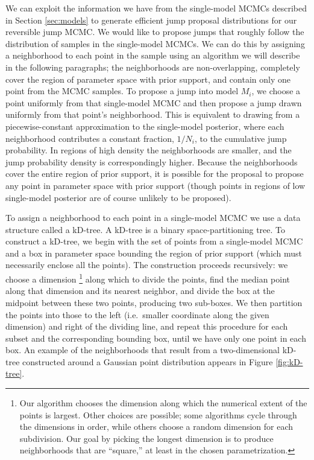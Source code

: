 \documentclass[preprint]{aastex}
\begin{document}
We can exploit the information we have from the single-model MCMCs
described in Section \ref{sec:models} to generate efficient jump
proposal distributions for our reversible jump MCMC.  We would like to
propose jumps that roughly follow the distribution of samples in the
single-model MCMCs.  We can do this by assigning a neighborhood to
each point in the sample using an algorithm we will describe in the
following paragraphs; the neighborhoods are non-overlapping,
completely cover the region of parameter space with prior support, and
contain only one point from the MCMC samples.  To propose a jump into
model $M_i$, we choose a point uniformly from that single-model MCMC
and then propose a jump drawn uniformly from that point's
neighborhood.  This is equivalent to drawing from a piecewise-constant
approximation to the single-model posterior, where each neighborhood
contributes a constant fraction, $1/N_i$, to the cumulative jump
probability.  In regions of high density the neighborhoods are
smaller, and the jump probability density is correspondingly higher.
Because the neighborhoods cover the entire region of prior support, it
is possible for the proposal to propose any point in parameter space
with prior support (though points in regions of low single-model
posterior are of course unlikely to be proposed).

To assign a neighborhood to each point in a single-model MCMC we use a
data structure called a kD-tree.  A kD-tree is a binary
space-partitioning tree.  To construct a kD-tree, we begin with the
set of points from a single-model MCMC and a box in parameter space
bounding the region of prior support (which must necessarily enclose
all the points).  The construction proceeds recursively: we choose a
dimension%
\footnote{Our algorithm chooses the dimension along which the
  numerical extent of the points is largest.  Other choices are
  possible; some algorithms cycle through the dimensions in order,
  while others choose a random dimension for each subdivision.  Our
  goal by picking the longest dimension is to produce neighborhoods
  that are ``square,'' at least in the chosen parametrization.} %
along which to divide the points, find the median point along that
dimension and its nearest neighbor, and divide the box at the midpoint
between these two points, producing two sub-boxes.  We then partition
the points into those to the left (i.e.\ smaller coordinate along the
given dimension) and right of the dividing line, and repeat this
procedure for each subset and the corresponding bounding box, until we
have only one point in each box.  An example of the neighborhoods that
result from a two-dimensional kD-tree constructed around a Gaussian
point distribution appears in Figure \ref{fig:kD-tree}.
\end{document}

